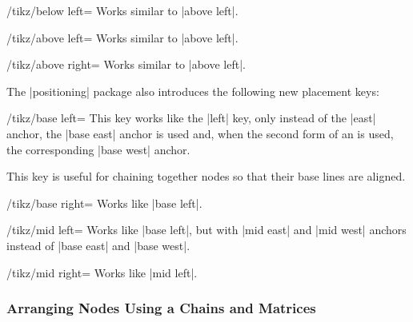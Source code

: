 \begin{key}{/tikz/below left=}
  Works similar to |above left|.
\end{key}
\begin{key}{/tikz/above left=}
  Works similar to |above left|.
\end{key}
\begin{key}{/tikz/above right=}
  Works similar to |above left|.
\end{key}

The |positioning| package also introduces the following new placement
keys:
\begin{key}{/tikz/base left=}
  This key works like the |left| key, only instead of the |east| anchor,
  the |base east| anchor is used and, when the second form of an
   is used, the corresponding |base west| anchor.

  This key is useful for chaining together nodes so that their base
  lines are aligned.
\begin{codeexample}[]
\end{codeexample}
\end{key}
\begin{key}{/tikz/base right=}
  Works like |base left|.
\end{key}
\begin{key}{/tikz/mid left=}
  Works like |base left|, but with |mid east| and |mid west| anchors
  instead of |base east| and |base west|.
\end{key}
\begin{key}{/tikz/mid right=}
  Works like |mid left|.
\end{key}




\subsubsection{Arranging Nodes Using a Chains and Matrices}

